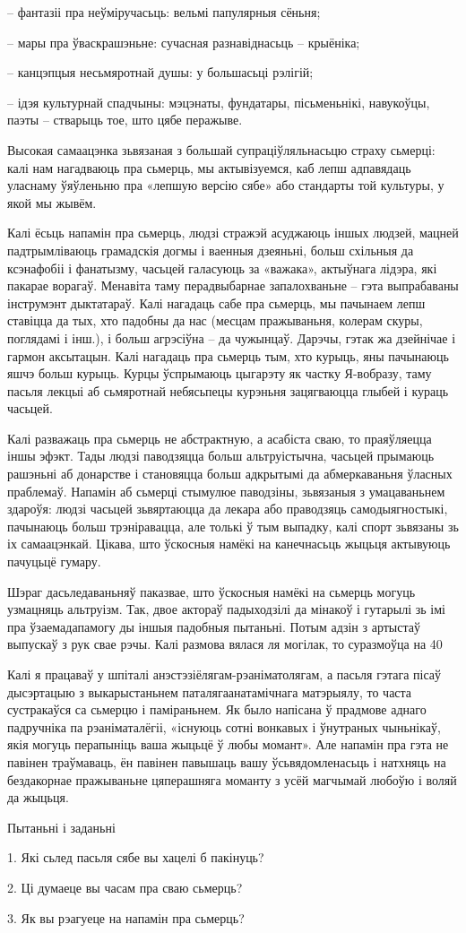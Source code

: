 – фантазіі пра неўміручасьць: вельмі папулярныя сёньня;

– мары пра ўваскрашэньне: сучасная разнавіднасьць – крыёніка;

– канцэпцыя несьмяротнай душы: у большасьці рэлігій;

– ідэя культурнай спадчыны: мэцэнаты, фундатары, пісьменьнікі, навукоўцы, паэты – стварыць тое, што цябе перажыве.

Высокая самаацэнка зьвязаная з большай супраціўляльнасьцю страху сьмерці: калі нам нагадваюць пра сьмерць, мы актывізуемся, каб лепш адпавядаць уласнаму ўяўленьню пра «лепшую версію сябе» або стандарты той культуры, у якой мы жывём.

Калі ёсьць напамін пра сьмерць, людзі стражэй асуджаюць іншых людзей, мацней падтрымліваюць грамадскія догмы і ваенныя дзеяньні, больш схільныя да ксэнафобіі і фанатызму, часьцей галасуюць за «важака», актыўнага лідэра, які пакарае ворагаў. Менавіта таму перадвыбарнае запалохваньне – гэта выпрабаваны інструмэнт дыктатараў. Калі нагадаць сабе пра сьмерць, мы пачынаем лепш ставіцца да тых, хто падобны да нас (месцам пражываньня, колерам скуры, поглядамі і інш.), і больш агрэсіўна – да чужынцаў. Дарэчы, гэтак жа дзейнічае і гармон аксытацын. Калі нагадаць пра сьмерць тым, хто курыць, яны пачынаюць яшчэ больш курыць. Курцы ўспрымаюць цыгарэту як частку Я-вобразу, таму пасьля лекцыі аб сьмяротнай небясьпецы курэньня зацягваюцца глыбей і кураць часьцей.

Калі разважаць пра сьмерць не абстрактную, а асабіста сваю, то праяўляецца іншы эфэкт. Тады людзі паводзяцца больш альтруістычна, часьцей прымаюць рашэньні аб донарстве і становяцца больш адкрытымі да абмеркаваньня ўласных праблемаў. Напамін аб сьмерці стымулюе паводзіны, зьвязаныя з умацаваньнем здароўя: людзі часьцей зьвяртаюцца да лекара або праводзяць самодыягностыкі, пачынаюць больш трэніравацца, але толькі ў тым выпадку, калі спорт зьвязаны зь іх самаацэнкай. Цікава, што ўскосныя намёкі на канечнасьць жыцьця актывуюць пачуцьцё гумару.

Шэраг дасьледаваньняў паказвае, што ўскосныя намёкі на сьмерць могуць узмацняць альтруізм. Так, двое актораў падыходзілі да мінакоў і гутарылі зь імі пра ўзаемадапамогу ды іншыя падобныя пытаньні. Потым адзін з артыстаў выпускаў з рук свае рэчы. Калі размова вялася ля могілак, то суразмоўца на 40%

Калі я працаваў у шпіталі анэстэзіёлягам-рэаніматолягам, а пасьля гэтага пісаў дысэртацыю з выкарыстаньнем паталягаанатамічнага матэрыялу, то часта сустракаўся са сьмерцю і паміраньнем. Як было напісана ў прадмове аднаго падручніка па рэаніматалёгіі, «існуюць сотні вонкавых і ўнутраных чыньнікаў, якія могуць перапыніць ваша жыцьцё ў любы момант». Але напамін пра гэта не павінен траўмаваць, ён павінен павышаць вашу ўсьвядомленасьць і натхняць на бездакорнае пражываньне цяперашняга моманту з усёй магчымай любоўю і воляй да жыцьця.

Пытаньні і заданьні

1. Які сьлед пасьля сябе вы хацелі б пакінуць?

2. Ці думаеце вы часам пра сваю сьмерць?

3. Як вы рэагуеце на напамін пра сьмерць?

